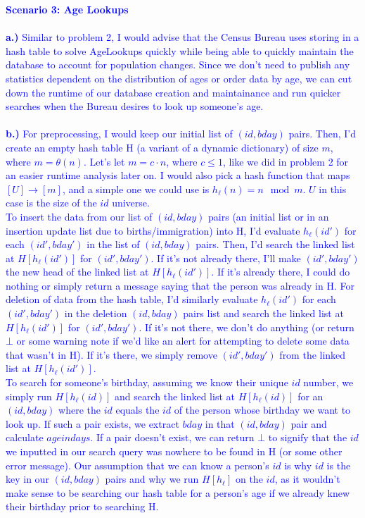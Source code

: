 \documentclass[11pt]{article}
\begin{document}
\begin{enumerate}
\textcolor{blue}{
\textbf{Scenario 3: Age Lookups} \\ \\
\textbf{a.)} Similar to problem 2, I would advise that the Census Bureau uses storing in a hash table to solve AgeLookups quickly while being able to quickly maintain the database to account for population changes. Since we don't need to publish any statistics dependent on the distribution of ages or order data by age, we can cut down the runtime of our database creation and maintainance and run quicker searches when the Bureau desires to look up someone's age. \\ \\
\textbf{b.)} For preprocessing, I would keep our initial list of $(id, bday)$ pairs. Then, I'd create an empty hash table H (a variant of a dynamic dictionary) of size $m$, where $m = \theta(n)$. Let's let $m = c\cdot n$, where $c \leq 1$, like we did in problem 2 for an easier runtime analysis later on. I would also pick a hash function that maps $[U] \rightarrow [m]$, and a simple one we could use is $h_{\ell}(n) = n \mod m$. $U$ in this case is the size of the $id$ universe. \\
To insert the data from our list of $(id, bday)$ pairs (an initial list or in an insertion update list due to births/immigration) into H, I'd evaluate $h_{\ell}(id')$ for each $(id', bday')$ in the list of $(id, bday)$ pairs. Then, I'd search the linked list at $H[h_{\ell}(id')]$ for $(id', bday')$. If it's not already there, I'll make $(id', bday')$ the new head of the linked list at $H[h_{\ell}(id')]$. If it's already there, I could do nothing or simply return a message saying that the person was already in H. For deletion of data from the hash table, I'd similarly evaluate $h_{\ell}(id')$ for each $(id', bday')$ in the deletion $(id, bday)$ pairs list and search the linked list at $H[h_{\ell}(id')]$ for $(id', bday')$. If it's not there, we don't do anything (or return $\bot$ or some warning note if we'd like an alert for attempting to delete some data that wasn't in H). If it's there, we simply remove $(id', bday')$ from the linked list at $H[h_{\ell}(id')]$. \\
To search for someone's birthday, assuming we know their unique $id$ number, we simply run $H[h_{\ell}(id)]$ and search the linked list at $H[h_{\ell}(id)]$ for an $(id, bday)$ where the $id$ equals the $id$ of the person whose birthday we want to look up. If such a pair exists, we extract $bday$ in that $(id, bday)$ pair and calculate $ageindays$. If a pair doesn't exist, we can return $\bot$ to signify that the $id$ we inputted in our search query was nowhere to be found in H (or some other error message). Our assumption that we can know a person's $id$ is why $id$ is the key in our $(id, bday)$ pairs and why we run $H[h_{\ell}]$ on the $id$, as it wouldn't make sense to be searching our hash table for a person's age if we already knew their birthday prior to searching H.\\ \\
}
\end{enumerate}
\end{document}
